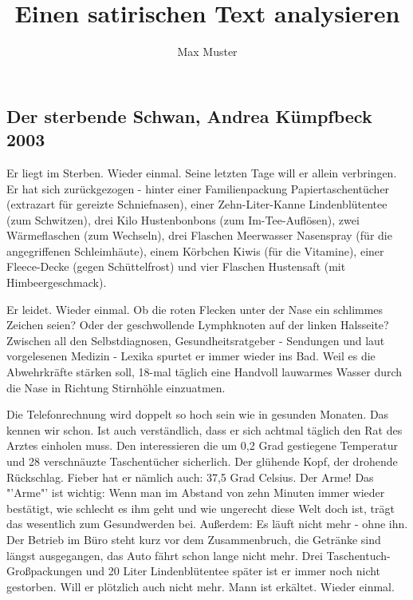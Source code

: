 \documentclass[12pt,a4paper]{scrartcl}
\begin{document}
 
\author{Max Muster} 
\title{Einen satirischen Text analysieren} 
\maketitle 
\modulolinenumbers[5]
\begin{linenumbers}


\section{Der sterbende Schwan, Andrea Kümpfbeck 2003} 
Er liegt im Sterben. Wieder einmal. Seine letzten Tage will er allein verbringen. Er hat sich zurückgezogen - hinter einer Familienpackung Papiertaschentücher (extrazart für gereizte Schniefnasen), einer Zehn-Liter-Kanne Lindenblütentee (zum Schwitzen), drei Kilo Hustenbonbons (zum Im-Tee-Auflösen), zwei Wärmeflaschen (zum Wechseln), drei Flaschen Meerwasser Nasenspray (für die angegriffenen Schleimhäute), einem Körbchen Kiwis (für die Vitamine), einer Fleece-Decke (gegen Schüttelfrost) und vier Flaschen Hustensaft (mit Himbeergeschmack).

Er leidet. Wieder einmal. Ob die roten Flecken unter der Nase ein schlimmes Zeichen seien? Oder der geschwollende Lymphknoten auf der linken Halsseite? Zwischen all den Selbstdiagnosen, Gesundheitsratgeber - Sendungen und laut vorgelesenen Medizin - Lexika spurtet er immer wieder ins Bad. Weil es die Abwehrkräfte stärken soll, 18-mal täglich eine Handvoll lauwarmes Wasser durch die Nase in Richtung Stirnhöhle einzuatmen.

Die Telefonrechnung wird doppelt so hoch sein wie in gesunden Monaten. Das kennen wir schon. Ist auch verständlich, dass er sich achtmal täglich den Rat des Arztes einholen muss. Den interessieren die um 0,2 Grad gestiegene Temperatur und 28 verschnäuzte Taschentücher sicherlich. Der glühende Kopf, der drohende Rückschlag. Fieber hat er nämlich auch: 37,5 Grad Celsius. Der Arme! Das "'Arme"' ist wichtig: Wenn man im Abstand von zehn Minuten immer wieder bestätigt, wie schlecht es ihm geht und wie ungerecht diese Welt doch ist, trägt das wesentlich zum Gesundwerden bei. Außerdem: Es läuft nicht mehr - ohne ihn. Der Betrieb im Büro steht kurz vor dem Zusammenbruch, die Getränke sind längst ausgegangen, das Auto fährt schon lange nicht mehr. Drei Taschentuch-Großpackungen und 20 Liter Lindenblütentee später ist er immer noch nicht gestorben. Will er plötzlich auch nicht mehr. Mann ist erkältet. Wieder einmal.
\end{linenumbers}
\end{document}
